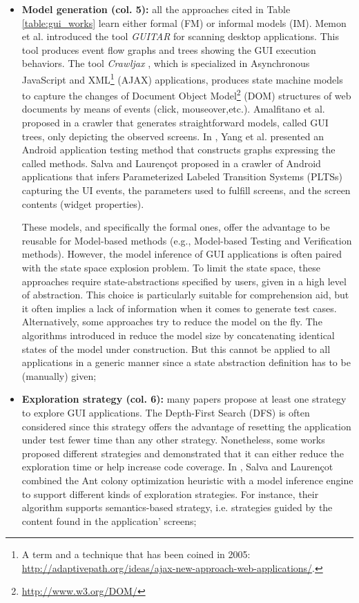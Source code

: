 \begin{itemize}
	\item \textbf{Model generation (col. 5):} all the approaches
	cited in Table \ref{table:gui_works} learn either formal
	(FM) or informal models (IM). Memon et al. \cite{guitar}
	introduced the tool \textit{GUITAR} for scanning desktop
	applications. This tool produces event flow graphs and trees
	showing the GUI execution behaviors. The tool
	\textit{Crawljax} \cite{crawljax:tweb12}, which is
	specialized in Asynchronous JavaScript and XML\footnote{A term and a technique that has been coined in 2005: \url{http://adaptivepath.org/ideas/ajax-new-approach-web-applications/}.} (AJAX) applications, produces state machine
	models to capture the changes of Document Object Model\footnote{\url{http://www.w3.org/DOM/}} (DOM)
	structures of web documents by means of events (click,
	mouseover,etc.).
	Amalfitano et al. proposed in
	\cite{Amalfitano:2012:UGR:2351676.2351717} a crawler that
	generates straightforward models, called GUI trees, only
	depicting the observed screens. In \cite{WPX13}, Yang et al.
	presented an Android application testing method that
	constructs graphs expressing the called methods. Salva and
	Laurençot proposed in \cite{SP15} a crawler of Android
	applications that infers Parameterized Labeled Transition
	Systems (PLTSs) capturing the UI events, the parameters used
	to fulfill screens, and the screen contents (widget
	properties).

	These models, and specifically the formal ones, offer the
	advantage to be reusable for Model-based methods
	(e.g., Model-based Testing and Verification methods).
	However, the model inference of GUI applications is often
	paired with the state space explosion problem. To limit the
	state space, these approaches
	\cite{MobiGUITARIEEESoftware2014,guitar,5954416,WPX13,SP15}
	require state-abstractions specified by users, given in a
	high level of abstraction. This choice is particularly
	suitable for comprehension aid, but it often implies a lack
	of information when it comes to generate test cases.
	Alternatively, some approaches try to reduce the model on
	the fly. The algorithms introduced in
	\cite{crawljax:tweb12,4656395} reduce the model size by
	concatenating identical states of the model under
	construction.  But this cannot be  applied to all
	applications in a generic manner since a state abstraction
	definition has to be (manually) given;

	\item \textbf{Exploration strategy (col. 6):} many
	papers propose at least one strategy to explore GUI
	applications. The Depth-First Search (DFS) is often
	considered since this strategy offers the advantage of
	resetting the application under test fewer time than any other
	strategy. Nonetheless, some works proposed different strategies
	\cite{Amalfitano:2012:UGR:2351676.2351717,5954416,crawljax:tweb12,WPX13}
	and demonstrated that it can either reduce the exploration
	time or help increase code coverage. In \cite{SP15}, Salva
	and Laurençot combined the Ant colony optimization heuristic
	with a model inference engine to support different kinds of
	exploration strategies. For instance, their algorithm
	supports semantics-based strategy, i.e. strategies guided by
	the content found in the application' screens;


\end{itemize}
